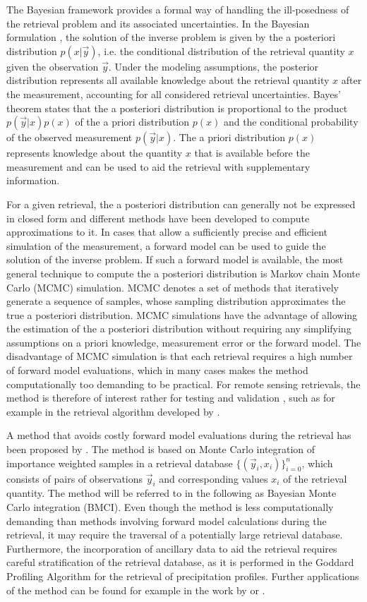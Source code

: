 \documentclass[journal abbreviation, manuscript]{copernicus}
\begin{document}
The Bayesian framework provides a formal way of handling the ill-posedness of
the retrieval problem and its associated uncertainties. In the Bayesian
formulation \citep{rodgers}, the solution of the inverse problem is given by the
a posteriori distribution $p(x | \vec{y})$, i.e. the conditional distribution of
the retrieval quantity $x$ given the observation $\vec{y}$. Under the modeling
assumptions, the posterior distribution represents all available knowledge about
the retrieval quantity $x$ after the measurement, accounting for all considered
retrieval uncertainties. Bayes' theorem states that the a posteriori
distribution is proportional to the product $p(\vec{y} | x)p(x)$ of the a priori
distribution $p(x)$ and the conditional probability of the observed measurement
$p(\vec{y} | x)$. The a priori distribution $p(x)$ represents knowledge about
the quantity $x$ that is available before the measurement and can be used to aid
the retrieval with supplementary information.

For a given retrieval, the a posteriori distribution can generally not be
expressed in closed form and different methods have been developed to compute
approximations to it. In cases that allow a sufficiently precise and efficient
simulation of the measurement, a forward model can be used to guide the solution
of the inverse problem. If such a forward model is available, the most general
technique to compute the a posteriori distribution is Markov chain Monte Carlo
(MCMC) simulation. MCMC denotes a set of methods that iteratively generate a
sequence of samples, whose sampling distribution approximates the true a
posteriori distribution. MCMC simulations have the advantage of allowing the
estimation of the a posteriori distribution without requiring any simplifying
assumptions on a priori knowledge, measurement error or the forward model.  The
 disadvantage of MCMC simulation is that each retrieval requires a
high number of forward model evaluations, which in many cases makes the method
computationally too demanding to be practical. For remote sensing retrievals, the
method is therefore of interest rather for testing and validation \citep{tamminen}, such
as for example in the retrieval algorithm developed by \cite{evans_2}.

A method that avoids costly forward model evaluations during the retrieval has
been proposed by \cite{kummerow_1}. The method is based on Monte Carlo
integration of importance weighted samples in a retrieval database
$\{(\vec{y}_i, x_i)\}_{i = 0}^n$, which consists of pairs of observations
$\vec{y}_i$ and corresponding values $x_i$ of the retrieval quantity. The
method will be referred to in the following as Bayesian Monte Carlo integration
(BMCI). Even though the method is less computationally demanding than methods
involving forward model calculations during the retrieval, it may require the
traversal of a potentially large retrieval database. Furthermore, the
incorporation of ancillary data to aid the retrieval requires careful
stratification of the retrieval database, as it is performed in the Goddard
Profiling Algorithm \citep{gprof} for the retrieval of precipitation profiles. 
Further applications of the method can be found for example in the work by
\cite{rydberg_2} or \cite{evans_2}.
\end{document}
